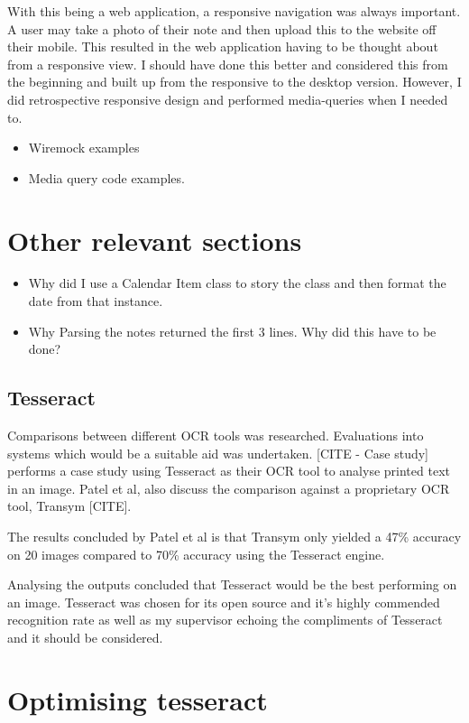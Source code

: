 With this being a web application, a responsive navigation was always important. A user may take a photo of their note and then upload this to the website off their mobile. This resulted in the web application having to be thought about from a responsive view. I should have done this better and considered this from the beginning and built up from the responsive to the desktop version. However, I did retrospective responsive design and performed media-queries when I needed to.
\begin{itemize}
  \item Wiremock examples
  \item Media query code examples.
\end{itemize}
\section{Other relevant sections}
\begin{itemize}
  \item Why did I use a Calendar Item class to story the class and then format the date from that instance.
  \item Why Parsing the notes returned the first 3 lines. Why did this have to be done?

\end{itemize}

\subsection{Tesseract}
Comparisons between different OCR tools was researched. Evaluations into systems which would be a suitable aid was undertaken. [CITE - Case study] performs a case study using Tesseract as their OCR tool to analyse printed text in an image. Patel et al, also discuss the comparison against a proprietary OCR tool, Transym [CITE].

The results concluded by Patel et al is that Transym only yielded a 47\% accuracy on 20 images compared to 70\% accuracy using the Tesseract engine.

Analysing the outputs concluded that Tesseract would be the best performing on an image. Tesseract was chosen for its open source and it's highly commended recognition rate as well as my supervisor echoing the compliments of Tesseract and it should be considered.

\section{Optimising tesseract}

